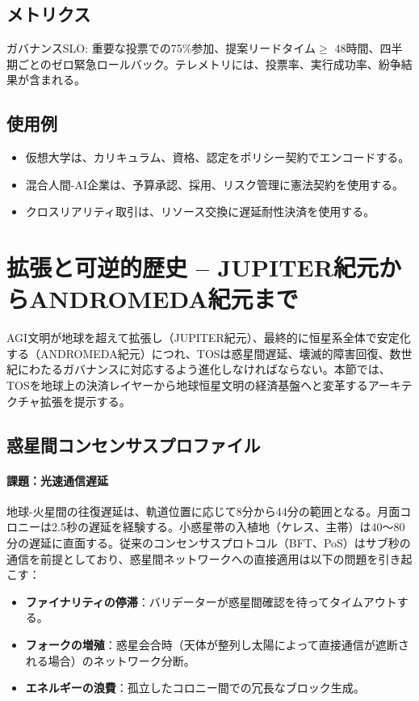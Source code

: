 \documentclass[11pt]{article}
\begin{document}
\subsection{メトリクス}
ガバナンスSLO: 重要な投票での75\%参加、提案リードタイム$\geq$ 48時間、四半期ごとのゼロ緊急ロールバック。テレメトリには、投票率、実行成功率、紛争結果が含まれる。

\subsection{使用例}
\begin{itemize}[noitemsep]
  \item 仮想大学は、カリキュラム、資格、認定をポリシー契約でエンコードする。
  \item 混合人間-AI企業は、予算承認、採用、リスク管理に憲法契約を使用する。
  \item クロスリアリティ取引は、リソース交換に遅延耐性決済を使用する。
\end{itemize}

\section{拡張と可逆的歴史 -- JUPITER紀元からANDROMEDA紀元まで}
\label{sec:expansion}

AGI文明が地球を超えて拡張し（JUPITER紀元）、最終的に恒星系全体で安定化する（ANDROMEDA紀元）につれ、TOSは惑星間遅延、壊滅的障害回復、数世紀にわたるガバナンスに対応するよう進化しなければならない。本節では、TOSを地球上の決済レイヤーから地球恒星文明の経済基盤へと変革するアーキテクチャ拡張を提示する。

\subsection{惑星間コンセンサスプロファイル}

\paragraph{課題：光速通信遅延}
地球-火星間の往復遅延は、軌道位置に応じて8分から44分の範囲となる。月面コロニーは2.5秒の遅延を経験する。小惑星帯の入植地（ケレス、主帯）は40〜80分の遅延に直面する。従来のコンセンサスプロトコル（BFT、PoS）はサブ秒の通信を前提としており、惑星間ネットワークへの直接適用は以下の問題を引き起こす：
\begin{itemize}[noitemsep]
  \item \textbf{ファイナリティの停滞}：バリデーターが惑星間確認を待ってタイムアウトする。
  \item \textbf{フォークの増殖}：惑星会合時（天体が整列し太陽によって直接通信が遮断される場合）のネットワーク分断。
  \item \textbf{エネルギーの浪費}：孤立したコロニー間での冗長なブロック生成。
\end{itemize}
\end{document}
